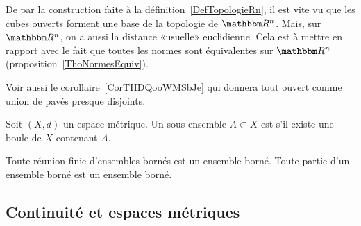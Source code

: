 \begin{remark}      \label{RemIPVLooHUXyeW}
    De par la construction faite à la définition~\ref{DefTopologieRn}, il est vite vu que les cubes ouverts forment une base de la topologie de \( \eR^n\). Mais, sur \( \eR^n \), on a aussi la distance «usuelle» euclidienne. Cela est à mettre en rapport avec le fait que toutes les normes sont équivalentes sur \( \eR^n\) (proposition~\ref{ThoNormesEquiv}).


    Voir aussi le corollaire~\ref{CorTHDQooWMSbJe} qui donnera tout ouvert comme union de pavés presque disjoints.
\end{remark}

\begin{definition}\label{DefEnsembleBorne}
  Soit \( (X, d) \) un espace métrique. Un sous-ensemble \( A \subset X \) est  s'il existe une boule de \( X \) contenant \( A \).
\end{definition}

\begin{proposition}
  Toute réunion finie d'ensembles bornés est un ensemble borné. Toute partie d'un ensemble borné est un ensemble borné.
\end{proposition}

\subsection{Continuité et espaces métriques}


